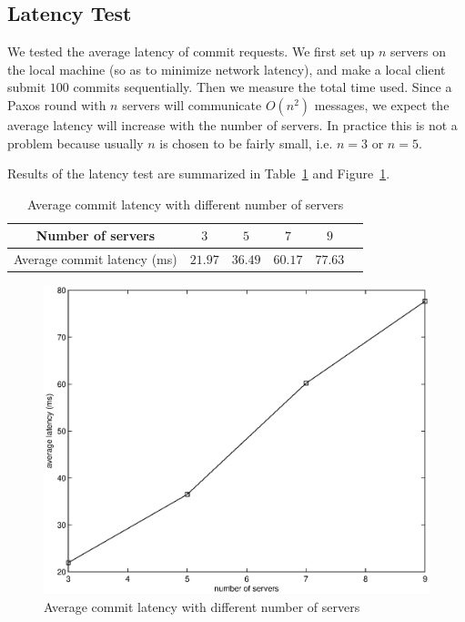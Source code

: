 \documentclass[11pt]{article}
\begin{document}
\subsection{Latency Test}
We tested the average latency of commit requests.
We first set up $n$ servers on the local machine (so as to minimize network latency), and make a local client submit $100$ commits sequentially.
Then we measure the total time used.
Since a Paxos round with $n$ servers will communicate $O(n^2)$ messages, we expect the average latency will increase with the number of servers.
In practice this is not a problem because usually $n$ is chosen to be fairly small, i.e. $n=3$ or $n=5$.

Results of the latency test are summarized in Table~\ref{tab:perf} and Figure~\ref{fig:perf}.
\begin{table}[ht!]
    \center
\begin{tabular}{c|ccccc}
    \hline
    \hline
    Number of servers & $3$ & $5$ & $7$ & $9$ \\
    \hline
    Average commit latency (ms) & $21.97$ & $36.49$ & $60.17$ & $77.63$ \\
    \hline
    \hline
\end{tabular}
\caption{Average commit latency with different number of servers}
\label{tab:perf}
\end{table}

\begin{figure}[ht!]
\centering
\includegraphics[width=12cm]{perf.eps}
\caption{Average commit latency with different number of servers}
\label{fig:perf}
\end{figure}
\end{document}
